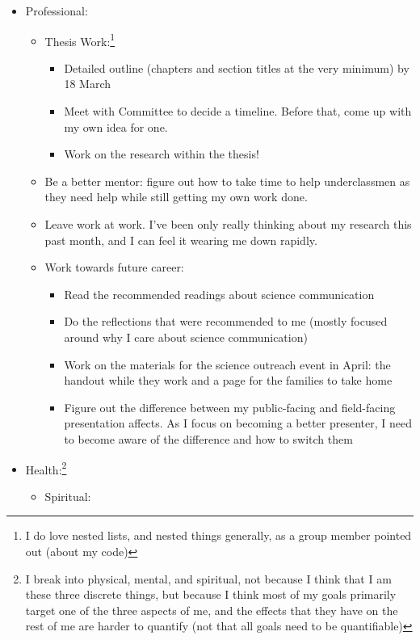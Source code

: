 \documentclass[12pt]{article}[titlepage]
\renewcommand{\,}{\textsuperscript{,}}
\begin{document}
\begin{itemize}  
\item Professional:  
\begin{itemize}  
\item Thesis Work:\footnote{I do love nested lists, and nested things generally, as a group member pointed out (about my code)}  
\begin{itemize}  
\item Detailed outline (chapters and section titles at the very minimum) by 18 March  
\item Meet with Committee to decide a timeline. Before that, come up with my own idea for one.  
\item Work on the research within the thesis!  
\end{itemize}  
\item Be a better mentor: figure out how to take time to help underclassmen as they need help while still getting my own work done.  
\item Leave work at work. I've been only really thinking about my research this past month, and I can feel it wearing me down rapidly.  
\item Work towards future career:  
\begin{itemize}  
\item Read the recommended readings about science communication  
\item Do the reflections that were recommended to me (mostly focused around why I care about science communication)  
\item Work on the materials for the science outreach event in April: the handout while they work and a page for the families to take home  
\item Figure out the difference between my public-facing and field-facing presentation affects. As I focus on becoming a better presenter, I need to become aware of the difference and how to switch them  
\end{itemize}  
\end{itemize}  
\item Health:\footnote{I break into physical, mental, and spiritual, not because I think that I am these three discrete things, but because I think most of my goals primarily target one of the three aspects of me, and the effects that they have on the rest of me are harder to quantify (not that all goals need to be quantifiable)}  
\begin{itemize}  
\item Spiritual:  
\begin{itemize}  

\end{itemize}
\end{itemize}
\end{itemize}
\end{document}
